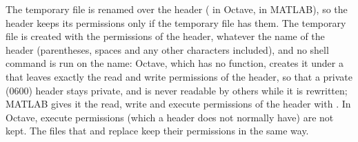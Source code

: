\begin{note}
The temporary file is renamed over the header ( in Octave, 
in MATLAB), so the header keeps its permissions only if the temporary file has them. The
temporary file is created with the permissions of the header, whatever the name of the
header (parentheses, spaces and any other characters included), and no shell command is
run on the name: Octave, which has no  function, creates it under a
 that leaves exactly the read and write permissions of the header, so that a
private (0600) header stays private, and is never readable by others while it is
rewritten; MATLAB gives it the read, write and execute permissions of the header with
. In Octave, execute permissions (which a header does not normally have)
are not kept. The files that  and 
replace keep their permissions in the same way.
\end{note}

